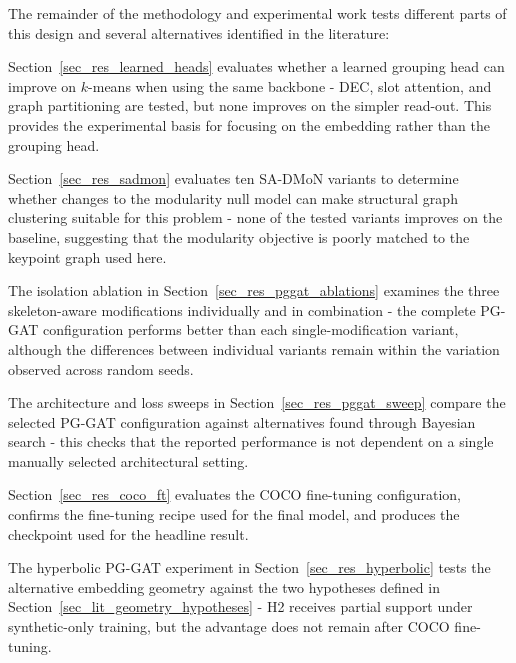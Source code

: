 The remainder of the methodology and experimental work
tests different parts of this design and several alternatives identified in the literature:

\begin{compactitem}
    \item Section~\ref{sec_res_learned_heads} evaluates whether a learned
    grouping head can improve on $k$-means when using the same backbone -
    DEC, slot attention, and graph partitioning are tested, but none
    improves on the simpler read-out. This provides the experimental
    basis for focusing on the embedding rather than the grouping head.

    \item Section~\ref{sec_res_sadmon} evaluates ten SA-DMoN variants to
    determine whether changes to the modularity null model can make
    structural graph clustering suitable for this problem - none of the
    tested variants improves on the baseline, suggesting
    that the modularity objective is poorly matched to the keypoint
    graph used here.

    \item The isolation ablation in
    Section~\ref{sec_res_pggat_ablations} examines the three
    skeleton-aware modifications individually and in combination - the
    complete PG-GAT configuration performs better than each
    single-modification variant, although the differences between
    individual variants remain within the variation observed across
    random seeds.

    \item The architecture and loss sweeps in
    Section~\ref{sec_res_pggat_sweep} compare the selected PG-GAT
    configuration against alternatives found through Bayesian search -
    this checks that the reported performance is not dependent on a
    single manually selected architectural setting.

    \item Section~\ref{sec_res_coco_ft} evaluates the COCO fine-tuning
    configuration, confirms the fine-tuning recipe used for the final
    model, and produces the checkpoint used for the headline result.

    \item The hyperbolic PG-GAT experiment in
    Section~\ref{sec_res_hyperbolic} tests the alternative embedding
    geometry against the two hypotheses defined in
    Section~\ref{sec_lit_geometry_hypotheses} - H2 receives partial
    support under synthetic-only training, but the advantage does not
    remain after COCO fine-tuning.


\end{compactitem}
